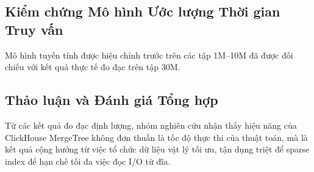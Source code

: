 \subsection{Kiểm chứng Mô hình Ước lượng Thời gian Truy vấn}
Mô hình tuyến tính được hiệu chỉnh trước trên các tập 1M--10M đã được đối chiếu với kết quả thực tế đo đạc trên tập 30M.


\subsection{Thảo luận và Đánh giá Tổng hợp}
Từ các kết quả đo đạc định lượng, nhóm nghiên cứu nhận thấy hiệu năng của ClickHouse MergeTree không đơn thuần là tốc độ thực thi của thuật toán, mà là kết quả cộng hưởng từ việc tổ chức dữ liệu vật lý tối ưu, tận dụng triệt để sparse index để hạn chế tối đa việc đọc I/O từ đĩa.

